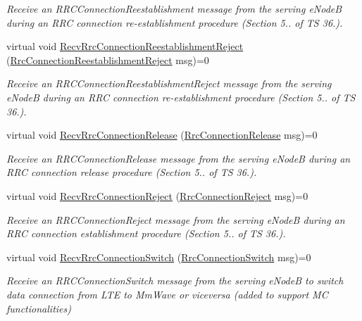 \begin{DoxyCompactItemize}
\begin{DoxyCompactList}\small\item\em Receive an {\itshape R\+R\+C\+Connection\+Reestablishment} message from the serving e\+NodeB during an R\+RC connection re-\/establishment procedure (Section 5.. of TS 36.). \end{DoxyCompactList}\item 
virtual void \hyperlink{classns3_1_1LteUeRrcSapProvider_a77a9855e3a2613a51abd65d5bacc759f}{Recv\+Rrc\+Connection\+Reestablishment\+Reject} (\hyperlink{structns3_1_1LteRrcSap_1_1RrcConnectionReestablishmentReject}{Rrc\+Connection\+Reestablishment\+Reject} msg)=0
\begin{DoxyCompactList}\small\item\em Receive an {\itshape R\+R\+C\+Connection\+Reestablishment\+Reject} message from the serving e\+NodeB during an R\+RC connection re-\/establishment procedure (Section 5.. of TS 36.). \end{DoxyCompactList}\item 
virtual void \hyperlink{classns3_1_1LteUeRrcSapProvider_a680b8881dd2f817c3745c41965d413e1}{Recv\+Rrc\+Connection\+Release} (\hyperlink{structns3_1_1LteRrcSap_1_1RrcConnectionRelease}{Rrc\+Connection\+Release} msg)=0
\begin{DoxyCompactList}\small\item\em Receive an {\itshape R\+R\+C\+Connection\+Release} message from the serving e\+NodeB during an R\+RC connection release procedure (Section 5.. of TS 36.). \end{DoxyCompactList}\item 
virtual void \hyperlink{classns3_1_1LteUeRrcSapProvider_a20b96bb1978b23963670d0d3b62bcb35}{Recv\+Rrc\+Connection\+Reject} (\hyperlink{structns3_1_1LteRrcSap_1_1RrcConnectionReject}{Rrc\+Connection\+Reject} msg)=0
\begin{DoxyCompactList}\small\item\em Receive an {\itshape R\+R\+C\+Connection\+Reject} message from the serving e\+NodeB during an R\+RC connection establishment procedure (Section 5.. of TS 36.). \end{DoxyCompactList}\item 
virtual void \hyperlink{classns3_1_1LteUeRrcSapProvider_ade488446e890f38224f21e37ea3db2a2}{Recv\+Rrc\+Connection\+Switch} (\hyperlink{structns3_1_1LteRrcSap_1_1RrcConnectionSwitch}{Rrc\+Connection\+Switch} msg)=0
\begin{DoxyCompactList}\small\item\em Receive an {\itshape R\+R\+C\+Connection\+Switch} message from the serving e\+NodeB to switch data connection from L\+TE to Mm\+Wave or viceversa (added to support MC functionalities) \end{DoxyCompactList}\item 

\end{DoxyCompactItemize}
